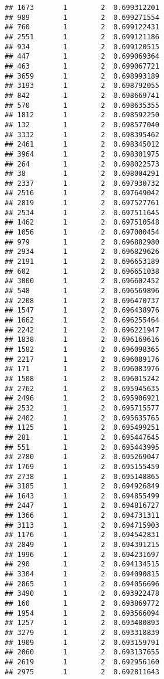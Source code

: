 \documentclass[
]{article}
\begin{document}
\begin{verbatim}
## 1673       1        2  0.699312201
## 989        1        2  0.699271554
## 760        1        2  0.699122431
## 2551       1        2  0.699121186
## 934        1        2  0.699120515
## 447        1        2  0.699069364
## 463        1        2  0.699067721
## 3659       1        2  0.698993189
## 3193       1        2  0.698792055
## 842        1        2  0.698669741
## 570        1        2  0.698635355
## 1812       1        2  0.698592250
## 132        1        2  0.698577040
## 3332       1        2  0.698395462
## 2461       1        2  0.698345012
## 3964       1        2  0.698301975
## 264        1        2  0.698022573
## 38         1        2  0.698004291
## 2337       1        2  0.697930732
## 2516       1        2  0.697649042
## 2819       1        2  0.697527761
## 2534       1        2  0.697511645
## 1462       1        2  0.697510548
## 1056       1        2  0.697000454
## 979        1        2  0.696882980
## 2934       1        2  0.696829626
## 2191       1        2  0.696653189
## 602        1        2  0.696651038
## 3000       1        2  0.696602452
## 548        1        2  0.696569896
## 2208       1        2  0.696470737
## 1547       1        2  0.696438976
## 1662       1        2  0.696255464
## 2242       1        2  0.696221947
## 1838       1        2  0.696169616
## 1582       1        2  0.696098365
## 2217       1        2  0.696089176
## 171        1        2  0.696083976
## 1508       1        2  0.696015242
## 2762       1        2  0.695945635
## 2496       1        2  0.695906921
## 2532       1        2  0.695715577
## 2402       1        2  0.695635765
## 1125       1        2  0.695499251
## 281        1        2  0.695447645
## 551        1        2  0.695443995
## 2780       1        2  0.695269047
## 1769       1        2  0.695155459
## 2738       1        2  0.695148865
## 3185       1        2  0.694926849
## 1643       1        2  0.694855499
## 2447       1        2  0.694816727
## 1366       1        2  0.694731311
## 3113       1        2  0.694715903
## 1176       1        2  0.694542831
## 2849       1        2  0.694391215
## 1996       1        2  0.694231697
## 290        1        2  0.694134515
## 3304       1        2  0.694090815
## 2865       1        2  0.694056696
## 3490       1        2  0.693922478
## 160        1        2  0.693869772
## 1954       1        2  0.693566094
## 1257       1        2  0.693480893
## 3279       1        2  0.693318839
## 1909       1        2  0.693159791
## 2060       1        2  0.693137655
## 2619       1        2  0.692956160
## 2975       1        2  0.692811643

\end{verbatim}
\end{document}
